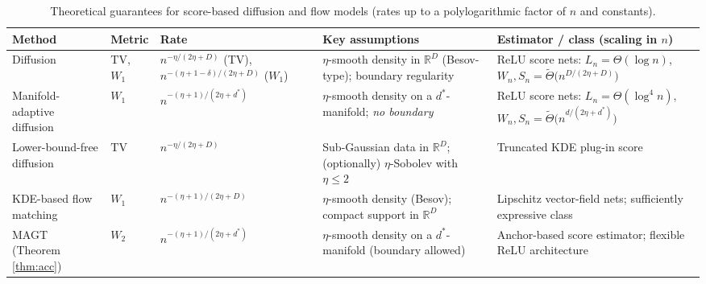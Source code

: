 \documentclass[12pt]{article}
\theoremstyle{definition} %
\begin{document}
\begin{table}[t]
  \centering
  \caption{Theoretical guarantees for score-based diffusion and flow models (rates up to a polylogarithmic
factor of $n$ and constants).}
  \label{tab:theory-generative-summary}
  \footnotesize
  \setlength{\tabcolsep}{4pt}
  \renewcommand{\arraystretch}{1.15}
  \begin{tabularx}{\textwidth}{@{}>{\raggedright\arraybackslash}p{} >{\raggedright\arraybackslash}p{} >{\raggedright\arraybackslash}p{} >{\raggedright\arraybackslash}p{} >{\raggedright\arraybackslash}X@{}}
    \toprule
    \textbf{Method} &
    \textbf{Metric} &
    \textbf{Rate} &
    \textbf{Key assumptions} &
    \textbf{Estimator / class (scaling in $n$)} \\
    \midrule

    Diffusion \citep{oko2023diffusion} &
    $\mathrm{TV}$,\; $W_1$ &
    $n^{-\eta/(2\eta+D)}$ (TV),\;
    $n^{-(\eta+1-\delta)/(2\eta+D)}$ ($W_1$) &
    $\eta$-smooth density in $\mathbb{R}^D$ (Besov-type); boundary regularity &
    ReLU score nets: $L_n=\Theta(\log n)$,\;
    $W_n,S_n=\widetilde{\Theta}\!\bigl(n^{D/(2\eta+D)}\bigr)$ \\

    Manifold-adaptive diffusion \citep{tang2024adaptivity} &
    $W_1$ &
    $n^{-(\eta+1)/(2\eta+d^*)}$ &
    $\eta$-smooth density on a $d^*$-manifold; \emph{no boundary} &
    ReLU score nets: $L_n=\Theta(\log^4 n)$,\;
    $W_n,S_n=\widetilde{\Theta}\!\bigl(n^{d/(2\eta+d^*)}\bigr)$ \\

    Lower-bound-free diffusion \citep{zhang2024minimax} &
    $\mathrm{TV}$ &
    $n^{-\eta/(2\eta+D)}$ &
    Sub-Gaussian data in $\mathbb{R}^D$; (optionally) $\eta$-Sobolev with $\eta\le 2$ &
    Truncated KDE plug-in score \\

    KDE-based flow matching \citep{kunkeltrabs2025fm_kde} &
    $W_1$ &
    $n^{-(\eta+1)/(2\eta+D)}$ &
    $\eta$-smooth density (Besov); compact support in $\mathbb{R}^D$ &
    Lipschitz vector-field nets; sufficiently expressive class \\

    \textsc{MAGT} (Theorem \ref{thm:acc}) &
    $W_2$ &
    $n^{-(\eta+1)/(2\eta+d^*)}$ &
    $\eta$-smooth density on a $d^*$-manifold (boundary allowed) &
    Anchor-based score estimator; flexible ReLU architecture \\
    \bottomrule
  \end{tabularx}
\end{table}
\end{document}
